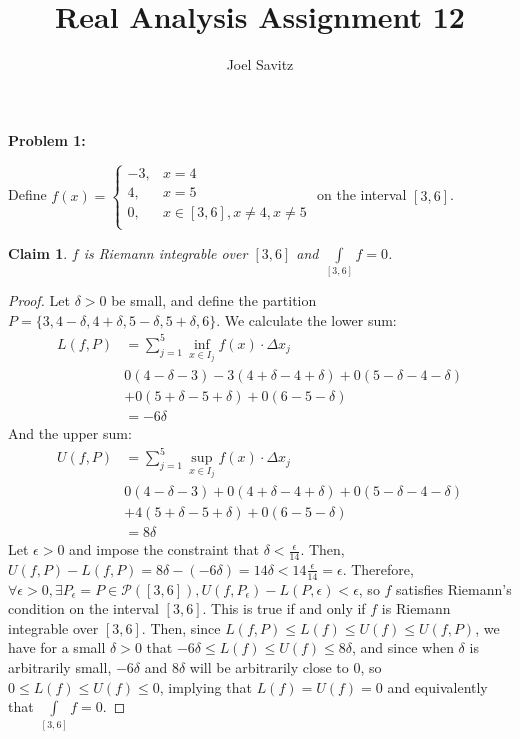 \documentclass{article}
\title{Real Analysis Assignment 12}
\author{Joel Savitz}
\newcommand{\eps}{\ensuremath{\epsilon}}
\newcommand{\infx}[1]{\ensuremath{\underset{#1}{\inf}}}
\newcommand{\supx}[1]{\ensuremath{\underset{#1}{\sup}}}
\newtheorem{clm}{Claim}
\begin{document}
\maketitle

\textbf{Problem 1:}

Define $f(x) = \begin{cases}
	-3, & x = 4 \\
	4, & x = 5 \\
	0, & x \in [3,6], x \neq 4, x \neq 5 \\
\end{cases}$ on the interval $[3,6]$.

\begin{clm}
	$f$ is Riemann integrable over $[3,6]$ and $\underset{[3,6]}{\int}f = 0$.
\end{clm}

\begin{proof}
	Let $\delta > 0$ be small,
	and define the partition
	$P = \{ 3, 4-\delta, 4+\delta, 5-\delta, 5+\delta, 6 \}$.
	We calculate the lower sum:
	\begin{align}
		L(f,P)   &= \sum_{j=1}^5 \infx{x \in I_j} f(x) \cdot \Delta x_j \\
			 & 0(4-\delta - 3) -3(4+\delta-4+\delta) + 0(5-\delta-4-\delta) \nonumber \\
			 &+ 0(5+\delta-5+\delta) + 0(6 - 5 - \delta) \\
			 &= -6\delta
	\end{align}
	And the upper sum:
	\begin{align}
		U(f,P)   &= \sum_{j=1}^5 \supx{x \in I_j} f(x) \cdot \Delta x_j \\
			 & 0(4-\delta - 3) + 0(4+\delta-4+\delta) + 0(5-\delta-4-\delta) \nonumber \\
			 &+ 4(5+\delta-5+\delta) + 0(6 - 5 - \delta) \\
			 &= 8\delta
	\end{align}
	Let $\eps > 0$ and impose the constraint that $\delta < \frac{\eps}{14}$.
	Then, $U(f,P) - L(f,P) = 8\delta - (-6\delta) = 14\delta < 14\frac{\eps}{14} = \eps$.
	Therefore,
	$\forall \eps > 0,
	\exists P_\eps = P \in \mathcal{P}([3,6]),
	U(f,P_\eps) - L(P,\eps) < \eps$,
	so $f$ satisfies Riemann's condition
	on the interval $[3,6]$.
	This is true if and only if
	$f$ is Riemann integrable over $[3,6]$.
	Then, since $L(f,P) \le L(f) \le U(f) \le U(f,P)$,
	we have for a small $\delta > 0$
	that $-6\delta \le L(f) \le U(f) \le 8\delta$,
	and since when $\delta$ is  arbitrarily small,
	$-6\delta$ and $8\delta$ will be arbitrarily close to $0$,
	so $0 \le L(f) \le U(f) \le 0$,
	implying that $L(f) = U(f) = 0$
	and equivalently that 
	$\underset{[3,6]}{\int}f = 0$.
\end{proof}
\end{document}
